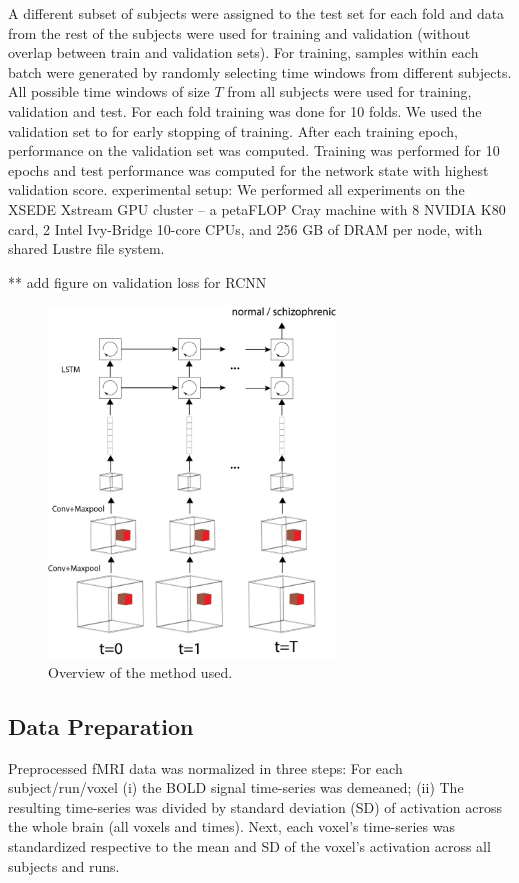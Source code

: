 \documentclass{article} %
\begin{document}
A different subset of subjects were assigned to the test set for each fold and data from the rest of the subjects were used for training and validation (without overlap between train and validation sets). For training, samples within each batch were generated by randomly selecting time windows from different subjects. All possible time windows of size $T$ from all subjects were used for training, validation and test. For each fold training was done for 10 folds. We used the validation set to for early stopping of training. After each training epoch, performance on the validation set was computed. Training was performed for 10 epochs and test performance was computed for the network state with highest validation score. 
experimental setup: We performed all experiments on the XSEDE Xstream GPU cluster \citep{Towns2014} -- a petaFLOP Cray machine with 8 NVIDIA K80 card, 2 Intel Ivy-Bridge 10-core CPUs, and 256 GB of DRAM per node, with shared Lustre file system.


** add figure on validation loss for RCNN

\begin{figure}[t]
\begin{center}
\includegraphics[width=3in]{figures/overview.png}
\end{center}
\caption{Overview of the method used.}
\label{fig1}
\end{figure}

\subsection{Data Preparation}
Preprocessed fMRI data was normalized in three steps: For each subject/run/voxel (i) the BOLD signal time-series was demeaned; (ii) The resulting time-series was divided by standard deviation (SD) of activation across the whole brain (all voxels and times). Next, each voxel’s time-series was standardized respective to the mean and SD of the voxel’s activation across all subjects and runs.
\end{document}
